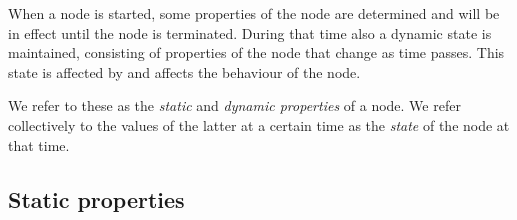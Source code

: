 
When a node is started, some properties of the node are determined and will be
in effect until the node is terminated.  During that time also a dynamic state
is maintained, consisting of properties of the node that change as time passes.
This state is affected by and affects the behaviour of the node.

We refer to these as the \emph{static} and \emph{dynamic properties} of a node.  We
refer collectively to the values of the latter at a certain time as the \emph{state}
of the node at that time.

\subsection{Static properties}

\label{section:node-state-static}

